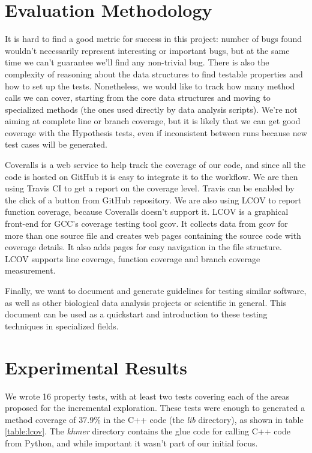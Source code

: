\documentclass[preprint,nocopyrightspace]{sig-alternate}
\begin{document}
\section{Evaluation Methodology}
It is hard to find a good metric for success in this project:
number of bugs found wouldn't necessarily represent interesting or important bugs,
but at the same time we can't guarantee we'll find any non-trivial bug.
There is also the complexity of reasoning about the data structures to find testable properties and how to set up the tests.
Nonetheless,
we would like to track how many method calls we can cover,
starting from the core data structures and moving to specialized methods (the ones used directly by data analysis scripts).
We're not aiming at complete line or branch coverage,
but it is likely that we can get good coverage with the Hypothesis tests,
even if inconsistent between runs because new test cases will be generated.

Coveralls is a web service to help track the coverage of our code,
and since all the code is hosted on GitHub it is easy to integrate it to the workflow.
We are then using Travis CI to get a report on the coverage level.
Travis can be enabled by the click of a button from GitHub repository.
We are also using LCOV to report function coverage,
because Coveralls doesn't support it.
LCOV is a graphical front-end for GCC's coverage testing tool gcov.
It collects data from gcov for more than one source file and creates web pages containing the
source code with coverage details.
It also adds pages for easy navigation in the file structure.
LCOV supports line coverage, function coverage and branch coverage measurement.

Finally,
we want to document and generate guidelines for testing similar software,
as well as other biological data analysis projects or scientific in general.
This document can be used as a quickstart and introduction to these testing techniques in specialized fields.

\section{Experimental Results}

We wrote 16 property tests,
with at least two tests covering each of the areas proposed for the incremental exploration.
These tests were enough to generated a method coverage of $37.9\%$ in the C++ code (the \emph{lib} directory),
as shown in table \ref{table:lcov}.
The \emph{khmer} directory contains the glue code for calling C++ code from Python,
and while important it wasn't part of our initial focus.
\end{document}
